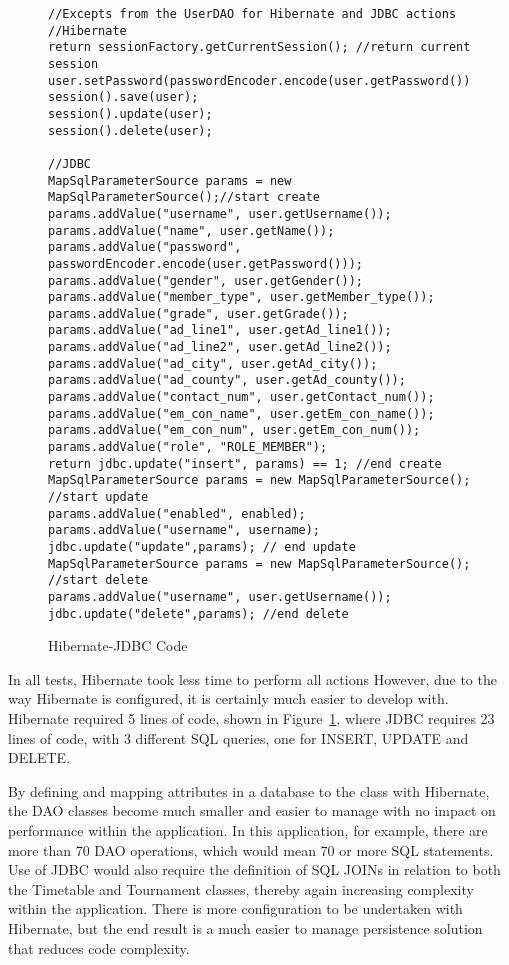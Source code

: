 \begin{figure}[H]
\begin{lstlisting}
//Excepts from the UserDAO for Hibernate and JDBC actions
//Hibernate
return sessionFactory.getCurrentSession(); //return current session
user.setPassword(passwordEncoder.encode(user.getPassword()));
session().save(user);
session().update(user);	
session().delete(user);

//JDBC
MapSqlParameterSource params = new MapSqlParameterSource();//start create
params.addValue("username", user.getUsername());
params.addValue("name", user.getName());
params.addValue("password", passwordEncoder.encode(user.getPassword()));
params.addValue("gender", user.getGender());
params.addValue("member_type", user.getMember_type());
params.addValue("grade", user.getGrade());
params.addValue("ad_line1", user.getAd_line1());
params.addValue("ad_line2", user.getAd_line2());
params.addValue("ad_city", user.getAd_city());
params.addValue("ad_county", user.getAd_county());
params.addValue("contact_num", user.getContact_num());
params.addValue("em_con_name", user.getEm_con_name());
params.addValue("em_con_num", user.getEm_con_num());
params.addValue("role", "ROLE_MEMBER");
return jdbc.update("insert", params) == 1; //end create
MapSqlParameterSource params = new MapSqlParameterSource(); //start update
params.addValue("enabled", enabled);
params.addValue("username", username);
jdbc.update("update",params); // end update
MapSqlParameterSource params = new MapSqlParameterSource(); //start delete
params.addValue("username", user.getUsername());
jdbc.update("delete",params); //end delete
\end{lstlisting}
\caption{Hibernate-JDBC Code}
\label{fig:jdbchibcode}
\end{figure}

In all tests, Hibernate took less time to perform all actions However, due to the way Hibernate is configured, it is certainly much easier to develop with. Hibernate required 5 lines of code, shown in Figure~\ref{fig:jdbchibcode}, where JDBC requires 23 lines of code, with 3 different SQL queries, one for INSERT, UPDATE and DELETE. 

By defining and mapping attributes in a database to the class with Hibernate, the DAO classes become much smaller and easier to manage with no impact on performance within the application. In this application, for example, there are more than 70 DAO operations, which would mean 70 or more SQL statements. Use of JDBC would also require the definition of SQL JOINs in relation to both the Timetable and Tournament classes, thereby again increasing complexity within the application. There is more configuration to be undertaken with Hibernate, but the end result is a much easier to manage persistence solution that reduces code complexity.

